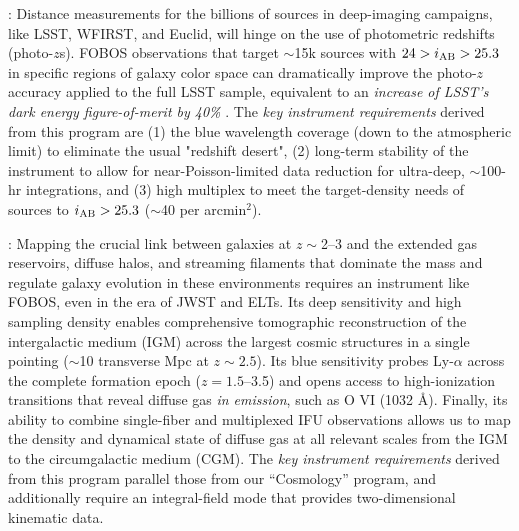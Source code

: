 \documentclass[oneside,11pt]{amsart}
\begin{document}
\smallskip

: Distance measurements for the
billions of sources in deep-imaging campaigns, like LSST, WFIRST, and
Euclid, will hinge on the use of photometric redshifts (photo-$z$s).
FOBOS observations that target $\sim$15k sources with $24 > i_{\rm
AB} > 25.3$ in specific regions of galaxy color space \citep[see][]{masters15, masters19} can dramatically improve the photo-$z$
accuracy applied to the full LSST sample, equivalent to an {\em
increase of LSST's dark energy figure-of-merit by 40\%} \citep{newman15}. The {\it key instrument requirements} derived
from this program are (1) the blue wavelength coverage (down to the
atmospheric limit) to eliminate the usual "redshift desert", (2)
long-term stability of the instrument to allow for
near-Poisson-limited data reduction for ultra-deep, $\sim$100-hr
integrations, and (3) high multiplex to meet the target-density needs
of sources to $i_{\rm AB} > 25.3$ ($\sim$40 per arcmin$^2$).

\smallskip

: Mapping the crucial link between galaxies at $z\sim$2--3 and
the extended gas reservoirs, diffuse halos, and streaming filaments
that dominate the mass and regulate galaxy evolution in these
environments requires an instrument like FOBOS, even in the era of
JWST and ELTs. Its deep sensitivity and high sampling density enables
comprehensive tomographic reconstruction of the intergalactic medium
(IGM) across the largest cosmic structures in a single pointing
($\sim$10 transverse Mpc at $z \sim 2.5$). Its blue sensitivity
probes Ly-$\alpha$ across the complete formation epoch ($z =
1.5$--3.5) and opens access to high-ionization transitions that
reveal diffuse gas \emph{in emission}, such as O VI (1032 \AA).
Finally, its ability to combine single-fiber and multiplexed IFU
observations allows us to map the density and dynamical state of
diffuse gas at all relevant scales from the IGM to the circumgalactic
medium (CGM). The {\it key instrument requirements} derived from this
program parallel those from our ``Cosmology'' program, and
additionally require an integral-field mode that provides
two-dimensional kinematic data.

\smallskip
\end{document}
